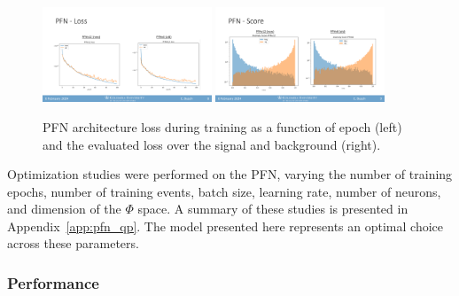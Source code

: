 \begin{figure}[!htbp]
\centering
   \includegraphics[width=0.45\textwidth]{figures/ml/pfn_loss}    
   \includegraphics[width=0.45\textwidth]{figures/ml/pfn_score}    
    \caption{PFN architecture loss during training as a function of epoch (left) and the evaluated loss over the signal and background (right).
    \label{fig:pfn_loss}}
\end{figure}

Optimization studies were performed on the PFN, varying the number of training epochs, number of training events, batch size, learning rate, number of neurons, and dimension of the $\Phi$ space. A summary of these studies is presented in Appendix~\ref{app:pfn_qp}. The model presented here represents an optimal choice across these parameters.

\subsubsection{Performance}

